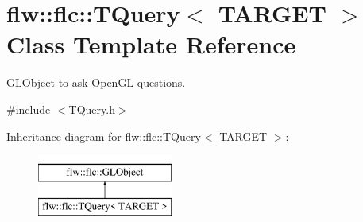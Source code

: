 \hypertarget{classflw_1_1flc_1_1TQuery}{}\section{flw\+:\+:flc\+:\+:T\+Query$<$ T\+A\+R\+G\+ET $>$ Class Template Reference}
\label{classflw_1_1flc_1_1TQuery}


\hyperlink{classflw_1_1flc_1_1GLObject}{G\+L\+Object} to ask Open\+GL questions.  




{\ttfamily \#include $<$T\+Query.\+h$>$}

Inheritance diagram for flw\+:\+:flc\+:\+:T\+Query$<$ T\+A\+R\+G\+ET $>$\+:\begin{figure}[H]
\begin{center}
\leavevmode
\includegraphics[height=2.000000cm]{classflw_1_1flc_1_1TQuery}
\end{center}
\end{figure}
